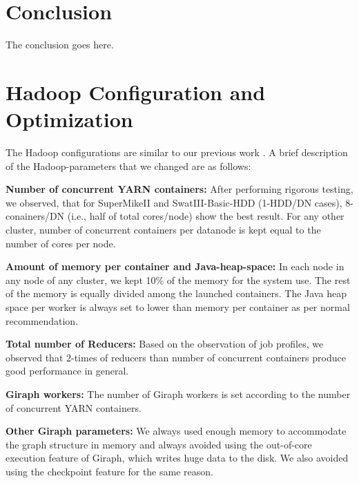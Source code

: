 \documentclass[journal]{IEEEtran}
\begin{document}




\section{Conclusion}
The conclusion goes here.




\appendices
\section{Hadoop Configuration and Optimization}
 \label{app:HadoopConfigurationsAndoptimizations}
The Hadoop configurations are similar to our previous work \cite{}. A brief description of the Hadoop-parameters that we changed are as follows:
  
\textbf{Number of concurrent YARN containers:} After performing rigorous testing,  we observed, that for SuperMikeII and SwatIII-Basic-HDD (1-HDD/DN cases), 8-conainers/DN (i.e., half of total cores/node) show the best result. For any other cluster, number of concurrent containers per datanode is kept equal to the number of cores per node. 

\textbf{Amount of memory per container and Java-heap-space:} In each node in any node of any cluster, we kept 10\% of the memory for the system use. The rest of the memory is equally divided among the launched containers. The Java heap space per worker is always set to lower than memory per container as per normal recommendation.

\textbf{Total number of Reducers:} Based on the observation of job profiles, we observed that 2-times of reducers than number of concurrent containers produce good performance in general. 

\textbf{Giraph workers:} The number of Giraph workers is set according to the number of concurrent YARN containers.

\textbf{Other Giraph parameters:} We always used enough memory to accommodate the graph structure in memory and always avoided using the out-of-core execution feature of Giraph, which writes huge data to the disk. We also avoided using the checkpoint feature for the same reason.
\end{document}
